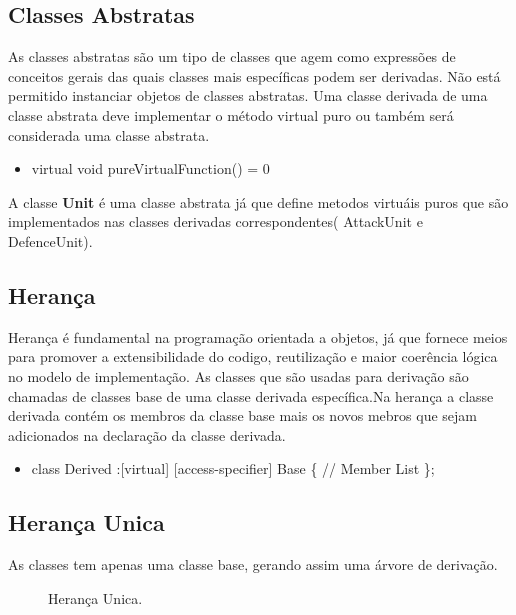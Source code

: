 \documentclass[rel_mlp]{iiufrgs}
\newcommand{\fonte}[1]{\\Fonte: {#1}}
\begin{document}
\subsection{Classes Abstratas}
As classes abstratas são um tipo de classes que agem como expressões de conceitos gerais das quais classes mais específicas podem ser derivadas. Não está permitido instanciar objetos de classes abstratas. 
Uma classe derivada de uma classe abstrata deve implementar o método virtual puro ou também será considerada uma classe abstrata.

 \begin{itemize}
 \item virtual void pureVirtualFunction() = 0  
 \end{itemize}  	
A classe \textbf{Unit} é uma classe abstrata já que define metodos virtuáis puros que são implementados nas classes derivadas correspondentes( AttackUnit e DefenceUnit).
\subsection{Herança}
Herança é fundamental na programação orientada a objetos, já que fornece meios para promover a extensibilidade do codigo, reutilização e maior coerência lógica no modelo de implementação. As classes que são usadas para derivação são chamadas de classes base de uma classe derivada específica.Na herança a classe derivada contém os membros da classe base mais os novos mebros que sejam adicionados na declaração da classe derivada.
 \begin{itemize}
 \item class Derived :[virtual] [access-specifier] Base
 \{ \bigbreak
 	\hspace{1cm} // Member List		
	\bigbreak
 \};  
 \end{itemize}  	
\subsection{Herança Unica} 	
As classes tem apenas uma classe base, gerando assim uma árvore de derivação.

\begin{figure}[htb]
    \centering
    \label{fig:figura2}
    \caption{Herança Unica.}
\end{figure}
\end{document}
